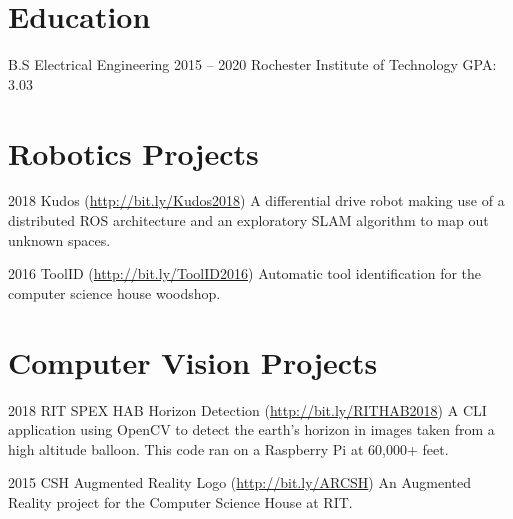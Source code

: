 \documentclass{tccv}
\begin{document}
\section{Education}

\begin{yearlist}

\item[B.S Electrical Engineering]{2015 -- 2020}
     {Rochester Institute of Technology}
     {GPA: 3.03}
     
\end{yearlist}


\section{Robotics Projects}

\begin{yearlist}

\item{2018}
     {Kudos (\href{http://bit.ly/Kudos2018}{http://bit.ly/Kudos2018})}
     {A differential drive robot making use of a distributed ROS architecture and an exploratory SLAM algorithm to map out unknown spaces.}

\item{2016}
     {ToolID (\href{http://bit.ly/ToolID2016}{http://bit.ly/ToolID2016})}
     {Automatic tool identification for the computer science house woodshop. }
     
\end{yearlist}


\section{Computer Vision Projects}

\begin{yearlist}

\item{2018}
     {RIT SPEX HAB Horizon Detection (\href{http://bit.ly/RITHAB2018}
     {http://bit.ly/RITHAB2018})}
     {A CLI application using OpenCV to detect the earth's horizon in images taken from a high altitude balloon. This code ran on a Raspberry Pi at 60,000+ feet.}
    
\item{2015}
     {CSH Augmented Reality Logo (\href{http://bit.ly/ARCSH}
     {http://bit.ly/ARCSH})}
     {An Augmented Reality project for the Computer Science House at RIT.}

\end{yearlist}
\end{document}
